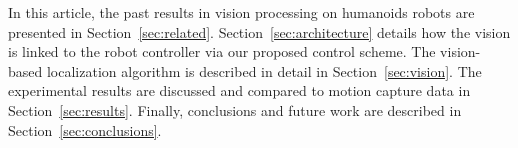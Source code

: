 In this article, the past results in vision processing on humanoids
robots are presented in
Section~\ref{sec:related}. Section~\ref{sec:architecture} details how
the vision is linked to the robot controller via our proposed control
scheme. The vision-based localization algorithm is described in detail
in Section~\ref{sec:vision}. The experimental results are discussed
and compared to motion capture data in
Section~\ref{sec:results}. Finally, conclusions and future work are
described in Section~\ref{sec:conclusions}.


